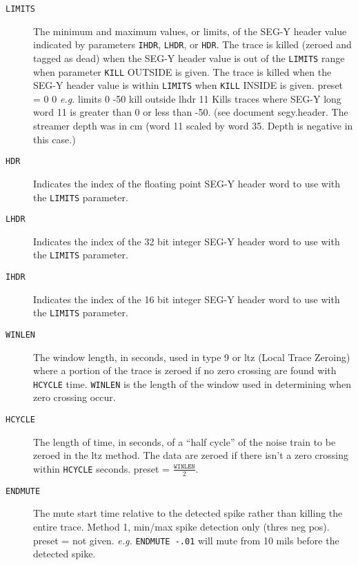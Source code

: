 \begin{description}
\item[\texttt{LIMITS}] The minimum and maximum values, or limits, of the SEG-Y
         header value indicated by parameters \texttt{IHDR}, \texttt{LHDR}, or \texttt{HDR}.
         The trace is killed (zeroed and tagged as dead) when the
         SEG-Y header value is out of the \texttt{LIMITS} range when parameter
         \texttt{KILL} OUTSIDE is given.  The trace is killed when the SEG-Y
         header value is within \texttt{LIMITS} when \texttt{KILL} INSIDE is given.
         \Gls{preset} = 0 0    \textit{e.g.}    limits 0 -50 kill outside lhdr 11
         Kills traces where SEG-Y long word 11 is greater than 0 or
         less than -50.  (see document segy.header.  The streamer
         depth was in cm (word 11 scaled by word 35.  Depth is
         negative in this case.)

\item[\texttt{HDR}] Indicates the index of the floating point SEG-Y header word to
         use with the \texttt{LIMITS} parameter.

\item[\texttt{LHDR}] Indicates the index of the 32 bit integer SEG-Y header word to
         use with the \texttt{LIMITS} parameter.

\item[\texttt{IHDR}] Indicates the index of the 16 bit integer SEG-Y header word to
         use with the \texttt{LIMITS} parameter.

\item[\texttt{WINLEN}] The window length, in seconds, used in type 9 or \gls{ltz} (Local
         Trace Zeroing) where a portion of the trace is zeroed if no
         zero crossing are found with \texttt{HCYCLE} time.  \texttt{WINLEN} is the
         length of the window used in determining when zero crossing
         occur.

\item[\texttt{HCYCLE}] The length of time, in seconds, of a ``half cycle'' of the
         noise train to be zeroed in the \gls{ltz} method.   The data
         are zeroed if there isn't a zero crossing within
         \texttt{HCYCLE} seconds.
         \Gls{preset} = $\frac{\texttt{WINLEN}}{2}$.

\item[\texttt{ENDMUTE}] The mute start time relative to the detected spike rather
         than killing the entire trace.  Method 1, min/max spike
         detection only (thres neg pos).
         \Gls{preset} = not given.   \textit{e.g.}   \texttt{ENDMUTE -.01}   will mute from
         10 mils before the detected spike.


\end{description}

